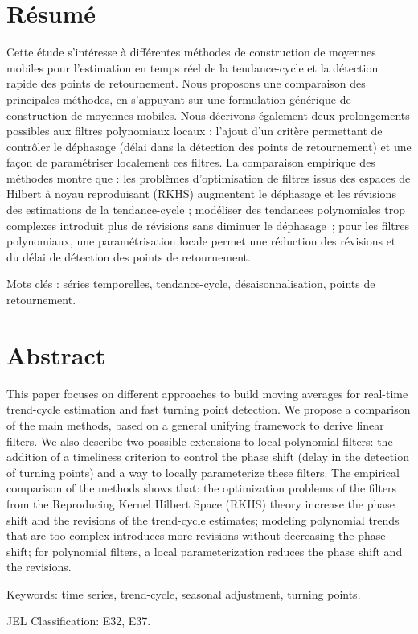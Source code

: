 \thispagestyle{fancy}

\hypertarget{ruxe9sumuxe9}{%
\section*{Résumé}\label{ruxe9sumuxe9}}

Cette étude s'intéresse à différentes méthodes de construction de
moyennes mobiles pour l'estimation en temps réel de la tendance-cycle et
la détection rapide des points de retournement. Nous proposons une
comparaison des principales méthodes, en s'appuyant sur une formulation
générique de construction de moyennes mobiles. Nous décrivons également
deux prolongements possibles aux filtres polynomiaux locaux : l'ajout
d'un critère permettant de contrôler le déphasage (délai dans la
détection des points de retournement) et une façon de paramétriser
localement ces filtres. La comparaison empirique des méthodes montre que
: les problèmes d'optimisation de filtres issus des espaces de Hilbert à
noyau reproduisant (RKHS) augmentent le déphasage et les révisions des
estimations de la tendance-cycle ; modéliser des tendances polynomiales
trop complexes introduit plus de révisions sans diminuer le déphasage~;
pour les filtres polynomiaux, une paramétrisation locale permet une
réduction des révisions et du délai de détection des points de
retournement.

Mots clés : séries temporelles, tendance-cycle, désaisonnalisation,
points de retournement.

\hypertarget{abstract}{%
\section*{Abstract}\label{abstract}}

This paper focuses on different approaches to build moving averages for
real-time trend-cycle estimation and fast turning point detection. We
propose a comparison of the main methods, based on a general unifying
framework to derive linear filters. We also describe two possible
extensions to local polynomial filters: the addition of a timeliness
criterion to control the phase shift (delay in the detection of turning
points) and a way to locally parameterize these filters. The empirical
comparison of the methods shows that: the optimization problems of the
filters from the Reproducing Kernel Hilbert Space (RKHS) theory increase
the phase shift and the revisions of the trend-cycle estimates; modeling
polynomial trends that are too complex introduces more revisions without
decreasing the phase shift; for polynomial filters, a local
parameterization reduces the phase shift and the revisions.

Keywords: time series, trend-cycle, seasonal adjustment, turning points.

JEL Classification: E32, E37.

\newpage
